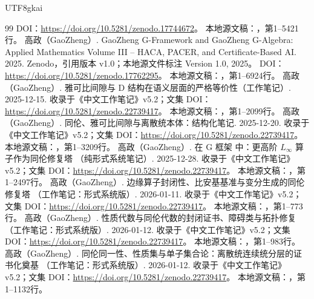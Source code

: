 \documentclass[11pt,a4paper]{article}
\theoremstyle{plain}
\theoremstyle{definition}
\theoremstyle{remark}
\begin{document}
\begin{CJK*}{UTF8}{gkai}
\begin{thebibliography}{99}
\newblock DOI：\url{https://doi.org/10.5281/zenodo.17744672}。
\newblock 本地源文稿：，第1--5421行。
高政（GaoZheng）. GaoZheng G-Framework and GaoZheng G-Algebra: Applied Mathematics Volume III -- HACA, PACER, and Certificate-Based AI. 2025.
\newblock Zenodo，引用版本 v1.0；本地源文件标注 Version 1.0, 2025。
\newblock DOI：\url{https://doi.org/10.5281/zenodo.17762295}。
\newblock 本地源文稿：，第1--6924行。
高政（GaoZheng）. 雅可比间隙与 D 结构在语义层面的严格等价性（工作笔记）. 2025-12-15.
\newblock 收录于《中文工作笔记》v5.2；文集 DOI：\url{https://doi.org/10.5281/zenodo.22739417}。
\newblock 本地源文稿：，第1--2099行。
高政（GaoZheng）. 同伦、雅可比间隙与离散统本体：结构化笔记. 2025-12-20.
\newblock 收录于《中文工作笔记》v5.2；文集 DOI：\url{https://doi.org/10.5281/zenodo.22739417}。
\newblock 本地源文稿：，第1--3209行。
高政（GaoZheng）. 在 G 框架 中：更高阶 $L_\infty$ 算子作为同伦修复塔 （纯形式系统笔记）. 2025-12-28.
\newblock 收录于《中文工作笔记》v5.2；文集 DOI：\url{https://doi.org/10.5281/zenodo.22739417}。
\newblock 本地源文稿：，第1--2497行。
高政（GaoZheng）. 边缘算子封闭性、比安基基准与变分生成的同伦修复塔 （工作笔记：形式系统版）. 2026-01-11.
\newblock 收录于《中文工作笔记》v5.2；文集 DOI：\url{https://doi.org/10.5281/zenodo.22739417}。
\newblock 本地源文稿：，第1--773行。
高政（GaoZheng）. 性质代数与同伦代数的封闭证书、障碍类与拓扑修复 （工作笔记：形式系统版）. 2026-01-12.
\newblock 收录于《中文工作笔记》v5.2；文集 DOI：\url{https://doi.org/10.5281/zenodo.22739417}。
\newblock 本地源文稿：，第1--983行。
高政（GaoZheng）. 同伦同一性、性质集与单子集合论：离散统连续统分层的证书化奠基 （工作笔记：形式系统版）. 2026-01-12.
\newblock 收录于《中文工作笔记》v5.2；文集 DOI：\url{https://doi.org/10.5281/zenodo.22739417}。
\newblock 本地源文稿：，第1--1132行。

\end{thebibliography}
\end{CJK*}
\end{document}
